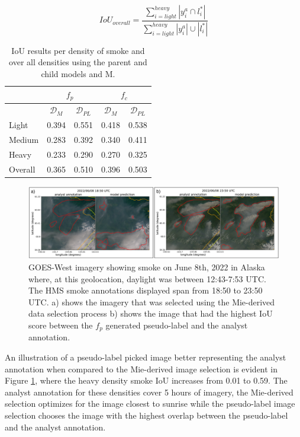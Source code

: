 \documentclass{article}
\begin{document}
\begin{equation} \label{overall_iou}
    IoU_{overall} = \frac{\sum\limits_{i=light}^{heavy}|y^a_{i}\cap l^*_{i}|  }{\sum\limits_{i=light}^{heavy}|y^a_{i}|\cup|l^*_{i}|}
\end{equation}

\begin{table} 
    \caption{IoU results per density of smoke and over all densities using the parent and child models and M.}\label{iou_results}
    \centering
    \begin{tabular}{lcc|cc}
        \toprule
        \multicolumn{1}{c}{} & \multicolumn{2}{c}{\(f_p\)} & \multicolumn{2}{c}{\(f_c\)}\\
        \midrule
        \multicolumn{1}{c}{} & \(\mathcal{D}_M\) & \(\mathcal{D}_{PL}\) & \(\mathcal{D}_M\) & \(\mathcal{D}_{PL}\) \\
        \midrule
        Light  & 0.394 &  0.551 & 0.418 &  0.538 \\
        Medium & 0.283 &  0.392 & 0.340 &  0.411 \\
        Heavy  & 0.233 &  0.290 & 0.270 &  0.325 \\
        Overall & 0.365 &  0.510 & 0.396 &  0.503 \\
        \bottomrule
    \end{tabular}
\end{table}

\begin{figure}
    \centering
    \includegraphics[width=14cm]{figures/D_m_vs_D_pl.png}
    \caption{GOES-West imagery showing smoke on June 8th, 2022 in Alaska where, at this geolocation, daylight was between 12:43-7:53 UTC. The HMS smoke annotations displayed span from 18:50 to 23:50 UTC. a) shows the imagery that was selected using the Mie-derived data selection process b) shows the image that had the highest IoU score between the \(f_p\) generated pseudo-label and the analyst annotation.}\label{ml_vs_mei}
\end{figure}

An illustration of a pseudo-label picked image better representing the analyst annotation when compared to the Mie-derived image selection is evident in Figure \ref{ml_vs_mei}, where the heavy density smoke IoU increases from 0.01 to 0.59. The analyst annotation for these densities cover 5 hours of imagery, the Mie-derived selection optimizes for the image closest to sunrise while the pseudo-label image selection chooses the image with the highest overlap between the pseudo-label and the analyst annotation. 
\end{document}
